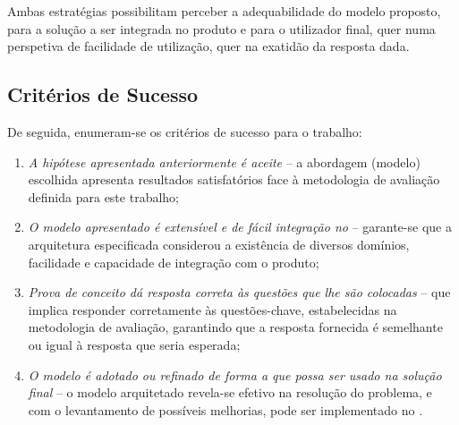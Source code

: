 Ambas estratégias possibilitam perceber a adequabilidade do modelo proposto, para a solução a ser integrada no produto e para o utilizador final, quer numa perspetiva de facilidade de utilização, quer na exatidão da resposta dada.

\subsection{Critérios de Sucesso}
De seguida, enumeram-se os critérios de sucesso para o trabalho:

\begin{enumerate}
    \item 
    {
        \textit{A hipótese apresentada anteriormente é aceite} -- a abordagem (modelo) escolhida apresenta resultados satisfatórios face à metodologia de avaliação definida para este trabalho;
    }
    \item
    {
        \textit{O modelo apresentado é extensível e de fácil integração no {\productname}} -- garante-se que a arquitetura especificada considerou a existência de diversos domínios, facilidade e capacidade de integração com o produto;
    }
    \item
    {
        \textit{Prova de conceito dá resposta correta às questões que lhe são colocadas} -- que implica responder corretamente às questões-chave, estabelecidas na metodologia de avaliação, garantindo que a resposta fornecida é semelhante ou igual à resposta que seria esperada;
    }
    \item
    {
        \textit{O modelo é adotado ou refinado de forma a que possa ser usado na solução final} -- o modelo arquitetado revela-se efetivo na resolução do problema, e com o levantamento de possíveis melhorias, pode ser implementado no {\productname}.
    }
\end{enumerate}

